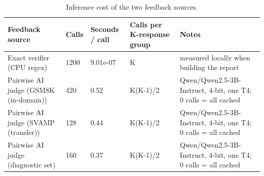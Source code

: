\begin{table}[t]
\centering
\small
\caption{Inference cost of the two feedback sources.}
\begin{tabular}{lllll}
\toprule
Feedback source & Calls & Seconds / call & Calls per K-response group & Notes \\
\midrule
Exact verifier (CPU regex) & 1200 & 9.01e-07 & K & measured locally when building the report \\
Pairwise AI judge (GSM8K (in-domain)) & 420 & 0.52 & K(K-1)/2 & Qwen/Qwen2.5-3B-Instruct, 4-bit, one T4; 0 calls = all cached \\
Pairwise AI judge (SVAMP (transfer)) & 128 & 0.44 & K(K-1)/2 & Qwen/Qwen2.5-3B-Instruct, 4-bit, one T4; 0 calls = all cached \\
Pairwise AI judge (diagnostic set) & 160 & 0.37 & K(K-1)/2 & Qwen/Qwen2.5-3B-Instruct, 4-bit, one T4; 0 calls = all cached \\
\bottomrule
\end{tabular}
\end{table}
